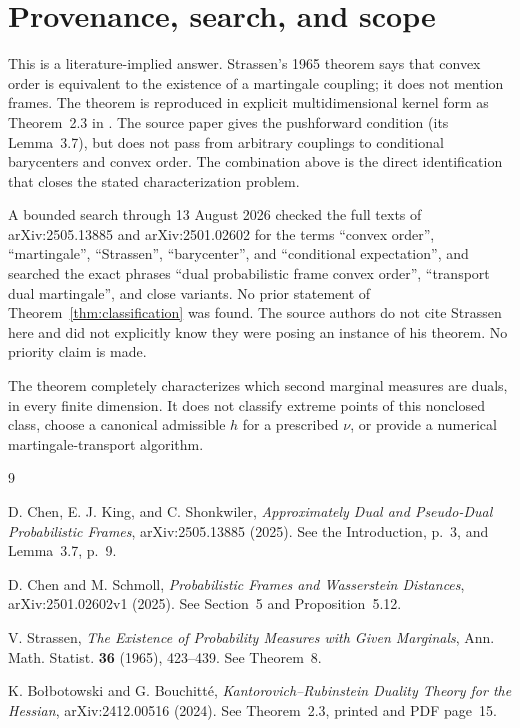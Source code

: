 \documentclass[11pt]{article}
\begin{document}
\section{Provenance, search, and scope}

This is a literature-implied answer. Strassen's 1965 theorem says that convex
order is equivalent to the existence of a martingale coupling; it does not
mention frames. The theorem is reproduced in explicit multidimensional kernel
form as Theorem~2.3 in \cite{BB}. The source paper gives the pushforward
condition (its Lemma~3.7), but does not pass from arbitrary couplings to
conditional barycenters and convex order. The combination above is the direct
identification that closes the stated characterization problem.

A bounded search through 13 August 2026 checked the full texts of
arXiv:2505.13885 and arXiv:2501.02602 for the terms
``convex order'', ``martingale'', ``Strassen'', ``barycenter'', and
``conditional expectation'', and searched the exact phrases
``dual probabilistic frame convex order'', ``transport dual martingale'', and
close variants. No prior statement of Theorem~\ref{thm:classification} was
found. The source authors do not cite Strassen here and did not explicitly
know they were posing an instance of his theorem. No priority claim is made.

The theorem completely characterizes which second marginal measures are
duals, in every finite dimension. It does not classify extreme points of this
nonclosed class, choose a canonical admissible $h$ for a prescribed $\nu$, or
provide a numerical martingale-transport algorithm.

\begin{sloppypar}
\begin{thebibliography}{9}
\raggedright
{}
D. Chen, E. J. King, and C. Shonkwiler,
\emph{Approximately Dual and Pseudo-Dual Probabilistic Frames},
arXiv:2505.13885 (2025). See the Introduction, p.~3, and Lemma~3.7, p.~9.

D. Chen and M. Schmoll,
\emph{Probabilistic Frames and Wasserstein Distances},
arXiv:2501.02602v1 (2025). See Section~5 and Proposition~5.12.

V. Strassen,
\emph{The Existence of Probability Measures with Given Marginals},
Ann. Math. Statist. \textbf{36} (1965), 423--439.
See Theorem~8.

K. Bo{\l}botowski and G. Bouchitt\'e,
\emph{Kantorovich--Rubinstein Duality Theory for the Hessian},
arXiv:2412.00516 (2024). See Theorem~2.3, printed and PDF page~15.
\end{thebibliography}
\end{sloppypar}
\end{document}
